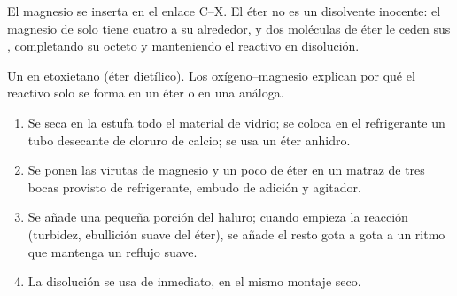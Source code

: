 El magnesio se inserta en el enlace C--X. El éter no es un disolvente
inocente: el magnesio de  solo tiene cuatro  a su alrededor, y dos moléculas de éter le ceden sus , completando su octeto y manteniendo el reactivo en
disolución.

\begin{omfigure}

{\small Un  en etoxietano (éter dietílico). Los
 oxígeno--magnesio explican por qué el reactivo solo se
forma en un éter o en una  análoga.}
\end{omfigure}

\begin{method}\label{met:b1:organomagnesium:prepare}
\begin{enumerate}
  \item Se seca en la estufa todo el material de vidrio; se coloca en el
        refrigerante un tubo desecante de cloruro de calcio; se usa un
        éter anhidro.
  \item Se ponen las virutas de magnesio y un poco de éter en un matraz de
        tres bocas provisto de refrigerante, embudo de adición y
        agitador.
  \item Se añade una pequeña porción del haluro; cuando empieza la
        reacción (turbidez, ebullición suave del éter), se añade el resto
        gota a gota a un ritmo que mantenga un reflujo suave.
  \item La disolución se usa de inmediato, en el mismo montaje seco.
\end{enumerate}
\end{method}

